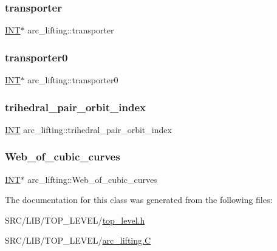 \subsubsection{\texorpdfstring{transporter}{transporter}}
{\footnotesize\ttfamily \mbox{\hyperlink{galois_8h_a09fddde158a3a20bd2dcadb609de11dc}{I\+NT}}$\ast$ arc\+\_\+lifting\+::transporter}

\mbox{\label{classarc__lifting_adba35f5934a227f0ab7125ecc41a983d}} 
\subsubsection{\texorpdfstring{transporter0}{transporter0}}
{\footnotesize\ttfamily \mbox{\hyperlink{galois_8h_a09fddde158a3a20bd2dcadb609de11dc}{I\+NT}}$\ast$ arc\+\_\+lifting\+::transporter0}

\mbox{\label{classarc__lifting_aa3e2a745c4daed0df0d6bc817ff6d4de}} 
\subsubsection{\texorpdfstring{trihedral\+\_\+pair\+\_\+orbit\+\_\+index}{trihedral\_pair\_orbit\_index}}
{\footnotesize\ttfamily \mbox{\hyperlink{galois_8h_a09fddde158a3a20bd2dcadb609de11dc}{I\+NT}} arc\+\_\+lifting\+::trihedral\+\_\+pair\+\_\+orbit\+\_\+index}

\mbox{\label{classarc__lifting_a86486e999cebaff176a3eed784f519ec}} 
\subsubsection{\texorpdfstring{Web\+\_\+of\+\_\+cubic\+\_\+curves}{Web\_of\_cubic\_curves}}
{\footnotesize\ttfamily \mbox{\hyperlink{galois_8h_a09fddde158a3a20bd2dcadb609de11dc}{I\+NT}}$\ast$ arc\+\_\+lifting\+::\+Web\+\_\+of\+\_\+cubic\+\_\+curves}



The documentation for this class was generated from the following files\+:\begin{DoxyCompactItemize}
\item 
S\+R\+C/\+L\+I\+B/\+T\+O\+P\+\_\+\+L\+E\+V\+E\+L/\mbox{\hyperlink{top__level_8h}{top\+\_\+level.\+h}}\item 
S\+R\+C/\+L\+I\+B/\+T\+O\+P\+\_\+\+L\+E\+V\+E\+L/\mbox{\hyperlink{arc__lifting_8_c}{arc\+\_\+lifting.\+C}}\end{DoxyCompactItemize}
